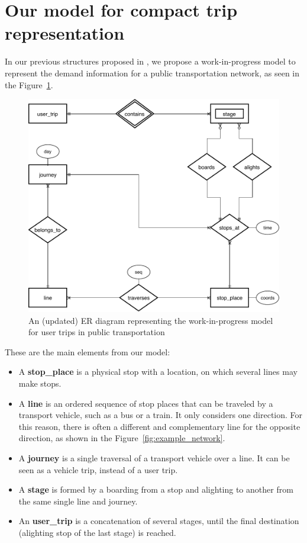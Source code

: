 \documentclass[runningheads]{llncs}
\begin{document}
\section{Our model for compact trip representation}
In our previous structures proposed in \cite{brisaboa2018new}, we propose a work-in-progress model to represent the demand information for a public transportation network, as seen in the Figure~\ref{fig:er}.

\begin{figure}
\includegraphics[width=\textwidth]{NetworkER.pdf}
\caption{An (updated) ER diagram representing the work-in-progress model for user trips in public transportation}
\label{fig:er}
\end{figure}

These are the main elements from our model:
\begin{itemize}
    \item A \textbf{stop\_place} is a physical stop with a location, on which several lines may make stops.
    \item A \textbf{line} is an ordered sequence of stop places that can be traveled by a transport vehicle, such as a bus or a train. It only considers one direction. For this reason, there is often a different and complementary line for the opposite direction, as shown in the Figure~\ref{fig:example_network}.
    \item A \textbf{journey} is a single traversal of a transport vehicle over a line. It can be seen as a vehicle trip, instead of a user trip.
    \item A \textbf{stage} is formed by a boarding from a stop and alighting to another from the same single line and journey.
    \item An \textbf{user\_trip} is a concatenation of several stages, until the final destination (alighting stop of the last stage) is reached.
\end{itemize}
\end{document}
